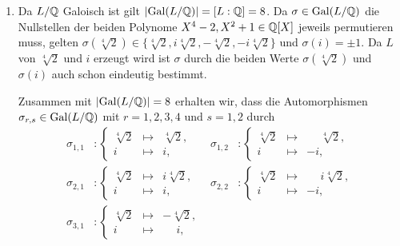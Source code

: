 \begin{solution}
\begin{enumerate}
    \item
      Da $L/\mathbb{Q}$ Galoisch ist gilt $|{\operatorname{Gal}(L / \mathbb{Q})}| = [L : \mathbb{Q}] = 8$.
      Da $\sigma \in \operatorname{Gal}(L / \mathbb{Q})$ die Nullstellen der beiden Polynome $X^4 - 2, X^2 + 1 \in \mathbb{Q}[X]$ jeweils permutieren muss, gelten $\sigma(\sqrt[4]{2}) \in \{ \sqrt[4]{2}, i\sqrt[4]{2}, -\sqrt[4]{2}, -i\sqrt[4]{2} \}$ und $\sigma(i) = \pm 1$.
      Da $L$ von $\sqrt[4]{2}$ und $i$ erzeugt wird ist $\sigma$ durch die beiden Werte $\sigma(\sqrt[4]{2})$ und $\sigma(i)$ auch schon eindeutig bestimmt.
      
      Zusammen mit $|{\operatorname{Gal}(L / \mathbb{Q})}| = 8$ erhalten wir, dass die Automorphismen $\sigma_{r,s} \in \operatorname{Gal}(L / \mathbb{Q})$ mit $r = 1, 2, 3, 4$ und $s = 1, 2$ durch
      \begin{align*}
        \sigma_{1,1}
        &\colon
        \left\{
          \begin{array}{rcl}
            \sqrt[4]{2} & \mapsto & \sqrt[4]{2},  \\
            i           & \mapsto & i,
          \end{array}
        \right.
        &
        \sigma_{1,2}
        &\colon
        \left\{
          \begin{array}{rcl}
            \sqrt[4]{2} & \mapsto & \phantom{-}\sqrt[4]{2},  \\
            i           & \mapsto &           -i,
          \end{array}
        \right.
        \\
        \sigma_{2,1}
        &\colon
        \left\{
          \begin{array}{rcl}
            \sqrt[4]{2} & \mapsto & i\sqrt[4]{2},  \\
            i           & \mapsto & i,
          \end{array}
        \right.
        &
        \sigma_{2,2}
        &\colon
        \left\{
          \begin{array}{rcl}
            \sqrt[4]{2} & \mapsto & \phantom{-}i\sqrt[4]{2},  \\
            i           & \mapsto &           -i,
          \end{array}
        \right.
        \\
        \sigma_{3,1}
        &\colon
        \left\{
          \begin{array}{rcl}
            \sqrt[4]{2} & \mapsto &           -\sqrt[4]{2},  \\
            i           & \mapsto & \phantom{-}i,

\end{array}
\end{align*}
\end{enumerate}
\end{solution}
